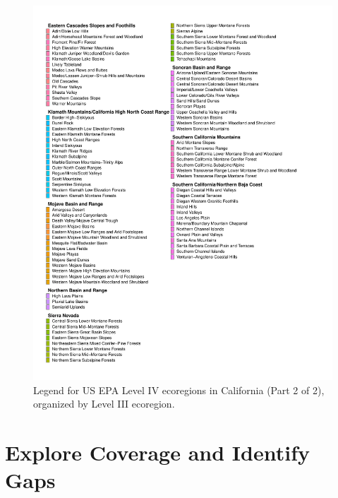 \documentclass[
  letterpaper,
  DIV=11,
  numbers=noendperiod]{scrartcl}
\begin{document}
\begin{figure}[H]

{\centering \includegraphics[width=1\textwidth,height=\textheight]{01_analyze_files/figure-pdf/legend-L4-page2-1.pdf}

}

\caption{Legend for US EPA Level IV ecoregions in California (Part 2 of
2), organized by Level III ecoregion.}

\end{figure}%

\newpage

\section{Explore Coverage and Identify
Gaps}\label{explore-coverage-and-identify-gaps}
\end{document}
